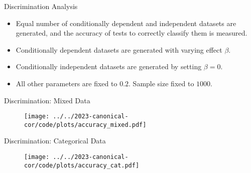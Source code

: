 \documentclass{beamer}
\begin{document}
\begin{frame}{Discrimination Analysis}

\begin{center}
\end{center}

\begin{itemize}
	\item Equal number of conditionally dependent and independent datasets are generated, and the accuracy of tests to correctly classify them is measured.
	\item Conditionally dependent datasets are generated with varying effect $ \beta $.
	\item Conditionally independent datasets are generated by setting $ \beta = 0 $.
	\item All other parameters are fixed to $ 0.2 $. Sample size fixed to $ 1000 $.
\end{itemize}

\end{frame}

\begin{frame}{Discrimination: Mixed Data}
	\begin{figure}[t]
		\centering
		\texttt{[image: ../../2023-canonical-cor/code/plots/accuracy\_mixed.pdf]}
	\end{figure}
\end{frame}

\begin{frame}{Discrimination: Categorical Data}
	\begin{figure}[t]
		\centering
		\texttt{[image: ../../2023-canonical-cor/code/plots/accuracy\_cat.pdf]}
	\end{figure}
\end{frame}


% 
% 
\end{document}
